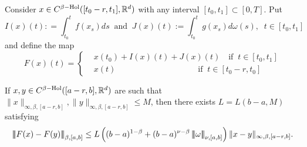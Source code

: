 \documentclass[graybox]{svmult}
\newcommand{\R}{\ensuremath{\mathbb{R}}}
\newcommand{\ltn}{\ensuremath{\left| \! \left| \! \left|}}
\newcommand{\rtn}{\ensuremath{\right| \! \right| \! \right|}}
\begin{document}
Consider $x\in C^{\beta\rm{-Hol}}([t_0-r,t_1],\R^d)$ with any interval $[t_0,t_1] \subset[0,T]$. 
Put
$$
I(x)(t): = \int_{t_0}^t f(x_s) ds\;\; \text{and}\;\; J(x)(t):= \int_{t_0}^t g(x_s)d\omega(s),\;\; t\in [t_0,t_1]
$$
and define the map
\[F(x)(t)=
\begin{cases}
&  x(t_0) + I(x)(t)+J(x)(t)\quad \text{if}\;\; t\in [t_0,t_1]\\
& x(t) \qquad \qquad \qquad \qquad \qquad \text{if}\;\; t\in [t_0-r,t_0]
\end{cases}
\]
\begin{lemma}\label{lem4}
	If $x,y\in C^{\beta\rm{-Hol}}([a-r,b],\R^d)$ are such that $\|x\|_{\infty,\beta,[a-r,b]}, \|y\|_{\infty,\beta,[a-r,b]}\leq M$, then there exists $L=L(b-a,M)$ satisfying
	\begin{equation}\label{lem4eq1}
	\ltn F(x)-F(y)\rtn_{\beta,[a,b]}\leq  L\left((b-a)^{1-\beta}+ (b-a)^{\nu-\beta}\ltn\omega\rtn_{\nu,[a,b]}\right) \| x-y\|_{\infty,\beta,[a-r,b]}.
	\end{equation}
\end{lemma}
\end{document}
